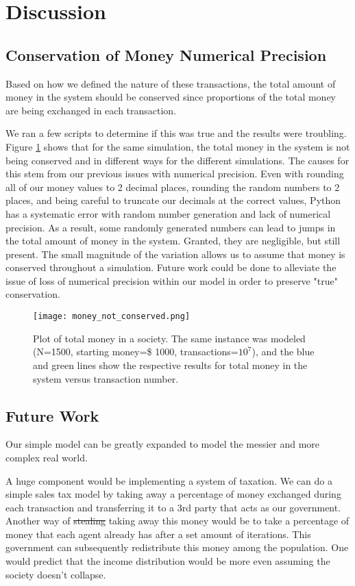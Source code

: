 \documentclass[11pt]{article}
\begin{document}
	
	\section{Discussion}
	\subsection{Conservation of Money Numerical Precision} \label{conservation}
	Based on how we defined the nature of these transactions, the total amount of money in the system should be conserved since proportions of the total money are being exchanged in each transaction. 
	
	We ran a few scripts to determine if this was true and the results were troubling. Figure \ref{shit} shows that for the same simulation, the total money in the system is not being conserved and in different ways for the different simulations. The causes for this stem from our previous issues with numerical precision. Even with rounding all of our money values to 2 decimal places, rounding the random numbers to 2 places, and being careful to truncate our decimals at the correct values, Python has a systematic error with random number generation and lack of numerical precision. As a result, some randomly generated numbers can lead to jumps in the total amount of money in the system. Granted, they are negligible, but still present. The small magnitude of the variation allows us to assume that money is conserved throughout a simulation. Future work could be done to alleviate the issue of loss of numerical precision within our model in order to preserve "true" conservation. 
	
	\begin{figure}[!ht]
		\centering
		\texttt{[image: money\_not\_conserved.png]}
		\caption{Plot of total money in a society. The same instance was modeled (N=1500, starting money=\$ 1000, transactions=$10^7$), and the blue and green lines show the respective results for total money in the system versus transaction number.}
		\label{shit}
	\end{figure}
	
	\subsection{Future Work}
	Our simple model can be greatly expanded to model the messier and more complex real world.
	
	A huge component would be implementing a system of taxation. We can do a simple sales tax model by taking away a percentage of money exchanged during each transaction and transferring it to a 3rd party that acts as our government. Another way of \sout{stealing} taking away this money would be to take a percentage of money that each agent already has after a set amount of iterations. This government can subsequently redistribute this money among the population. One would predict that the income distribution would be more even assuming the society doesn't collapse.
	
\end{document}
